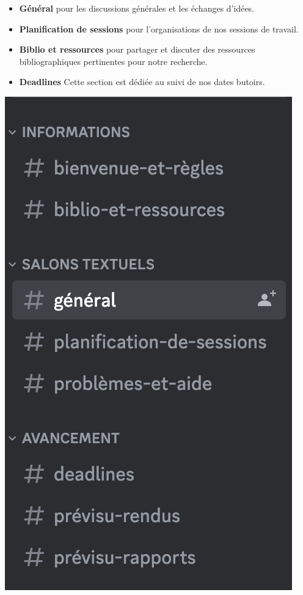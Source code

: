 \documentclass{article}
\begin{document}
\begin{minipage}{0.7\textwidth}
\begin{itemize}
    \item \textbf{Général} pour les discussions générales et les échanges d'idées.
    \item \textbf{Planification de sessions} pour l'organisations de nos sessions de travail.
    \item \textbf{Biblio et ressources} pour partager et discuter des ressources bibliographiques pertinentes pour notre recherche.
    \item \textbf{Deadlines} Cette section est dédiée au suivi de nos dates butoirs.\\
\end{itemize}
\end{minipage}
\vspace{-0.5cm}
\begin{minipage}{0.2\textwidth}
  \centering
  \includegraphics[width=\linewidth]{discord.png}
  \label{fig:label}
\end{minipage}
\end{document}
